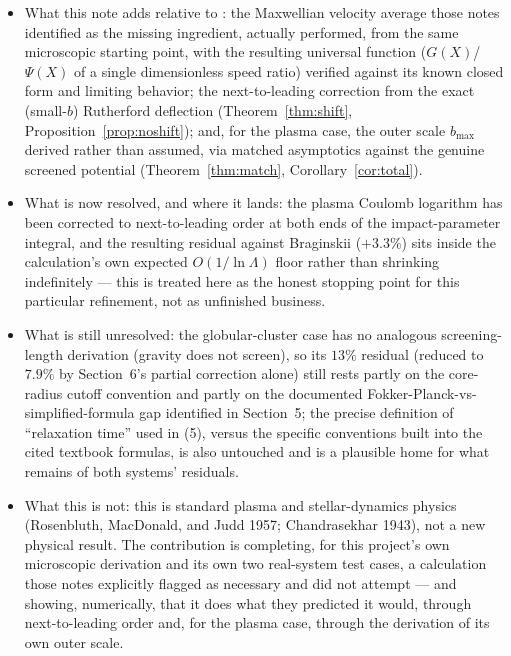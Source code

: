 \documentclass[12pt]{amsart}
\theoremstyle{plain}
\theoremstyle{remark}
\begin{document}
\begin{itemize}
\item[--] What this note adds relative to \cite{Ebert2026Fusion,Ebert2026Cluster,Ebert2026Residual}: the Maxwellian velocity average those notes identified as the missing ingredient, actually performed, from the same microscopic starting point, with the resulting universal function ($G(X)$/$\Psi(X)$ of a single dimensionless speed ratio) verified against its known closed form and limiting behavior; the next-to-leading correction from the exact (small-$b$) Rutherford deflection (Theorem~\ref{thm:shift}, Proposition~\ref{prop:noshift}); and, for the plasma case, the outer scale $b_{\max}$ derived rather than assumed, via matched asymptotics against the genuine screened potential (Theorem~\ref{thm:match}, Corollary~\ref{cor:total}).
\item[--] What is now resolved, and where it lands: the plasma Coulomb logarithm has been corrected to next-to-leading order at both ends of the impact-parameter integral, and the resulting residual against Braginskii ($+3.3\%$) sits inside the calculation's own expected $O(1/\ln\Lambda)$ floor rather than shrinking indefinitely --- this is treated here as the honest stopping point for this particular refinement, not as unfinished business.
\item[--] What is still unresolved: the globular-cluster case has no analogous screening-length derivation (gravity does not screen), so its $13\%$ residual (reduced to $7.9\%$ by Section~6's partial correction alone) still rests partly on the core-radius cutoff convention and partly on the documented Fokker-Planck-vs-simplified-formula gap identified in Section~5; the precise definition of ``relaxation time'' used in (5), versus the specific conventions built into the cited textbook formulas, is also untouched and is a plausible home for what remains of both systems' residuals.
\item[--] What this is not: this is standard plasma and stellar-dynamics physics (Rosenbluth, MacDonald, and Judd 1957; Chandrasekhar 1943), not a new physical result. The contribution is completing, for this project's own microscopic derivation and its own two real-system test cases, a calculation those notes explicitly flagged as necessary and did not attempt --- and showing, numerically, that it does what they predicted it would, through next-to-leading order and, for the plasma case, through the derivation of its own outer scale.
\end{itemize}
\end{document}
